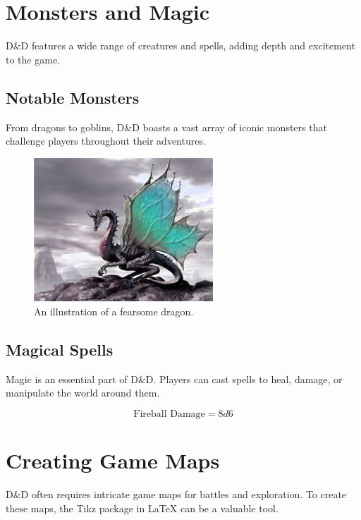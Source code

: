     \chapter{Monsters and Magic}\label{ch:monsters-and-magic}
    D\&D features a wide range of creatures and spells, adding depth and excitement to the game.


    \section{Notable Monsters}\label{sec:notable-monsters}
    From dragons to goblins, D\&D boasts a vast array of iconic monsters that challenge players throughout their adventures.

    \begin{figure}
        \centering
        \includegraphics[width=0.6\textwidth]{dragon}
        \caption{An illustration of a fearsome dragon.}\label{fig:figure}
    \end{figure}


    \section{Magical Spells}\label{sec:magical-spells}
    Magic is an essential part of D\&D. Players can cast spells to heal, damage, or manipulate the world around them.

    \begin{equation}
        \label{eq:fireball}
        \text{Fireball Damage} = 8d6
    \end{equation}


    \chapter{Creating Game Maps}\label{ch:creating-game-maps}
    D\&D often requires intricate game maps for battles and exploration. To create these maps, the Tikz package in LaTeX can be a valuable tool.

